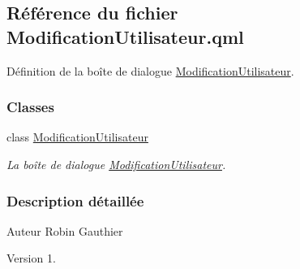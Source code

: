 \hypertarget{_modification_utilisateur_8qml}{}\subsection{Référence du fichier Modification\+Utilisateur.\+qml}
\label{_modification_utilisateur_8qml}


Définition de la boîte de dialogue \hyperlink{class_modification_utilisateur}{Modification\+Utilisateur}.  


\subsubsection*{Classes}
\begin{DoxyCompactItemize}
\item 
class \hyperlink{class_modification_utilisateur}{Modification\+Utilisateur}
\begin{DoxyCompactList}\small\item\em La boîte de dialogue \hyperlink{class_modification_utilisateur}{Modification\+Utilisateur}. \end{DoxyCompactList}\end{DoxyCompactItemize}


\subsubsection{Description détaillée}
\begin{DoxyAuthor}{Auteur}
Robin Gauthier
\end{DoxyAuthor}
\begin{DoxyVersion}{Version}
1. 
\end{DoxyVersion}
